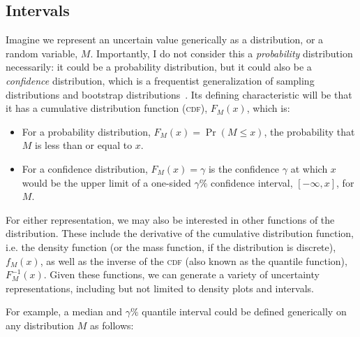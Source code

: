 \documentclass[journal]{vgtc}                     %
\begin{document}
\subsection{Intervals}

Imagine we represent an uncertain value generically as a distribution, or a random variable, $M$. Importantly, I do not consider this a \textit{probability} distribution necessarily: it could be a probability distribution, but it could also be a \textit{confidence} distribution, which is a frequentist generalization of sampling distributions and bootstrap distributions~\cite{xie2013confidence}. Its defining characteristic will be that it has a cumulative distribution function (\textsc{cdf}), $F_M(x)$, which is:
\begin{itemize}
    \item For a probability distribution, $F_M(x) = \Pr(M \le x)$, the probability that $M$ is less than or equal to $x$.
    \item   For a confidence distribution, $F_M(x) = \gamma$  is the confidence $\gamma$ at which $x$ would be the upper limit of a one-sided $\gamma\%$ confidence interval, $[-\infty, x]$, for $M$. %
\end{itemize}

For either representation, we may also be interested in other functions of the distribution. These include the derivative of the cumulative distribution function, i.e. the density function (or the mass function, if the distribution is discrete), $f_M(x)$, as well as the inverse of the \textsc{cdf} (also known as the quantile function), $F_M^{-1}(x)$. Given these functions, we can generate a variety of uncertainty representations, including but not limited to density plots and intervals.

For example, a median and $\gamma\%$ quantile interval could be defined generically on any distribution $M$ as follows:
\end{document}

